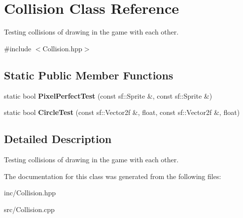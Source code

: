 \hypertarget{class_collision}{\section{Collision Class Reference}
\label{class_collision}
}


Testing collisions of drawing in the game with each other.  




{\ttfamily \#include $<$Collision.\+hpp$>$}

\subsection*{Static Public Member Functions}
\begin{DoxyCompactItemize}
\item 
\hypertarget{class_collision_a124262af79946728345a262e23ef930d}{static bool {\bfseries Pixel\+Perfect\+Test} (const sf\+::\+Sprite \&, const sf\+::\+Sprite \&)}\label{class_collision_a124262af79946728345a262e23ef930d}

\item 
\hypertarget{class_collision_af3fe9fef3b4b3e4efa8ad77fbf9fdc12}{static bool {\bfseries Circle\+Test} (const sf\+::\+Vector2f \&, float, const sf\+::\+Vector2f \&, float)}\label{class_collision_af3fe9fef3b4b3e4efa8ad77fbf9fdc12}

\end{DoxyCompactItemize}


\subsection{Detailed Description}
Testing collisions of drawing in the game with each other. 

The documentation for this class was generated from the following files\+:\begin{DoxyCompactItemize}
\item 
inc/Collision.\+hpp\item 
src/Collision.\+cpp\end{DoxyCompactItemize}
